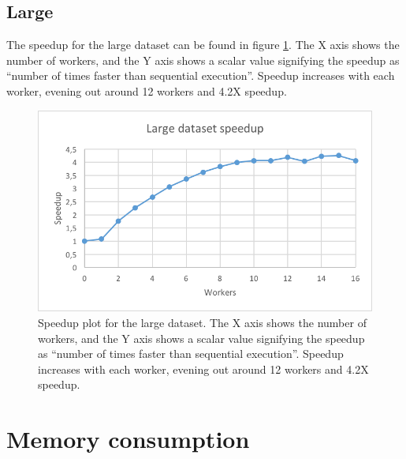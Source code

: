 \subsection{Large}
The speedup for the large dataset can be found in figure \ref{fig:dataset_4_speedup}.
The X axis shows the number of workers, and the Y axis shows a scalar value signifying the speedup as
``number of times faster than sequential execution''. Speedup increases with each worker, evening out around 12 workers and 4.2X speedup.
\begin{figure}[ht]
  \centering
  \includegraphics[width=120mm]{figures/dataset_4/dataset_4_speedup.png}
  \caption[Speedup plot for the large dataset.]{Speedup plot for the large dataset. The X axis shows the number of workers, and the Y axis shows a scalar value signifying the speedup as
  ``number of times faster than sequential execution''. Speedup increases with each worker, evening out around 12 workers and 4.2X speedup.}
  \label{fig:dataset_4_speedup}
\end{figure}

\section{Memory consumption}

